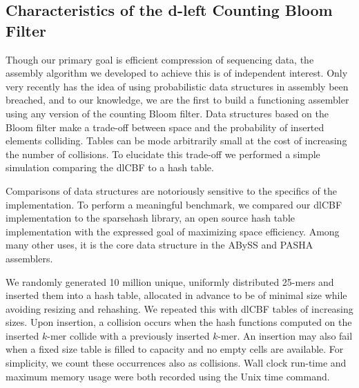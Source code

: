 \documentclass[a4,center,fleqn]{NAR}
\begin{document}
\subsection{Characteristics of the d-left Counting Bloom Filter}

\label{section:dlcbf_results}

Though our primary goal is efficient compression of sequencing data, the
assembly algorithm we developed to achieve this is of independent interest.
Only very recently has the idea of using probabilistic data structures in
assembly been breached, and to our knowledge, we are the first to build a
functioning assembler using any version of the counting Bloom filter. Data
structures based on the Bloom filter make a trade-off between space and
the probability of inserted elements colliding. Tables can be mode arbitrarily
small at the cost of increasing the number of collisions. To elucidate this
trade-off we performed a simple simulation comparing the dlCBF to a hash table.

Comparisons of data structures are notoriously sensitive to the specifics of
the implementation. To perform a meaningful benchmark, we compared our dlCBF
implementation to the sparsehash library, an open source hash table
implementation with the expressed goal of maximizing space efficiency. Among
many other uses, it is the core data structure in the ABySS
\citep{Simpson2011} and PASHA \citep{Liu2011} assemblers.

We randomly generated 10 million unique, uniformly distributed 25-mers and
inserted them into a hash table, allocated in advance to be of minimal size
while avoiding resizing and rehashing. We repeated this with dlCBF tables of
increasing sizes. Upon insertion, a collision occurs when the hash functions
computed on the inserted $k$-mer collide with a previously inserted $k$-mer.
An insertion may also fail when a fixed size table is filled to capacity and
no empty cells are available. For simplicity, we count these occurrences also
as collisions. Wall clock run-time and maximum memory usage were both recorded
using the Unix time command.
\end{document}
